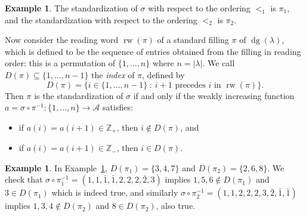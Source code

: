 \documentclass[11pt]{article}
\theoremstyle{definition}
\newtheorem{example}[theo]{Example}
\numberwithin{equation}{section}
\DeclareMathOperator{\dg}{dg}
\DeclareMathOperator{\rw}{rw}
\newcommand\cell[3]{
\def\i{#1} \def\j{#2} \def\entry{#3}

\draw (\j-1,-\i)--(\j,-\i)--(\j,-\i+1)--(\j-1,-\i+1)--(\j-1,-\i);
\node at (\j-.5,-\i+.5) {\entry};
}
\begin{document}
\begin{example}\label{example:std}
The standardization of $\sigma$ with respect to the ordering $<_1$ is $\pi_1$, and the standardization with respect to the ordering $<_2$ is $\pi_2$.
\begin{center}
\end{center}
\end{example}

Now consider the reading word $\rw(\pi)$ of a standard filling $\pi$ of $\dg(\lambda)$, which is defined to be the sequence of entries obtained from the filling in reading order: this is a permutation of $\{1,\ldots,n\}$ where $n=|\lambda|$. We call $D(\pi)\subseteq\{1,\ldots,n-1\}$ the \emph{index} of $\pi$, defined by
\[
D(\pi)=\big\{i \in \{1,\ldots,n-1\}\ :\ i+1 \text{ precedes } i \text{ in } \rw(\pi)\big\}.
\]
Then $\pi$ is the standardization of $\sigma$ if and only if the weakly increasing function $a=\sigma\circ \pi^{-1}:\{1,\ldots,n\}\rightarrow \mathcal{A}$ satisfies:
\begin{itemize}
\item if $a(i)=a(i+1)\in\mathbb{Z}_+$, then $i\not\in D(\pi)$, and
\item if $a(i)=a(i+1)\in\mathbb{Z}_-$, then $i\in D(\pi)$.
\end{itemize} 
\begin{example}
In Example~\ref{example:std}, $D(\pi_1)=\{3,4,7\}$ and $D(\pi_2)=\{2,6,8\}$. We check that $\sigma\circ\pi_1^{-1}=(1,1,\bar{1},\bar{1},2,2,2,\bar{2},3)$ implies $1,5,6 \not\in D(\pi_1)$ and $3\in D(\pi_1)$ which is indeed true, and similarly $\sigma\circ\pi_2^{-1}=(1,1,2,2,2,3,\bar{2},\bar{1},\bar{1})$ implies $1,3,4\not\in D(\pi_2)$ and $8\in D(\pi_2)$, also true. 
\end{example}
\end{document}
